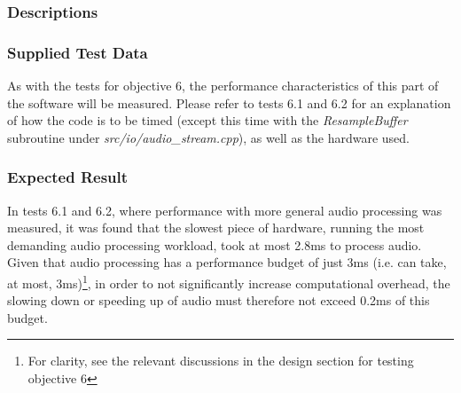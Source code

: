 \subsubsection*{Descriptions}
\paragraph{}
{
	\centering
}
\paragraph{}
{
	\centering
}

\subsubsection*{Supplied Test Data}
As with the tests for objective 6, the performance characteristics of this part of the software will be measured. Please refer to tests 6.1 and 6.2 for an explanation of how the code is to be timed (except this time with the \textit{ResampleBuffer} subroutine under \textit{src/io/audio\_stream.cpp}), as well as the hardware used.

\subsubsection*{Expected Result}
In tests 6.1 and 6.2, where performance with more general audio processing was measured, it was found that the slowest piece of hardware, running the most demanding audio processing workload, took at most 2.8ms to process audio.  Given that audio processing has a performance budget of just 3ms (i.e. can take, at most, 3ms)\footnote{
For clarity, see the relevant discussions in the design section for testing objective 6
}, in order to not significantly increase computational overhead, the slowing down or speeding up of audio must therefore not exceed 0.2ms of this budget.

